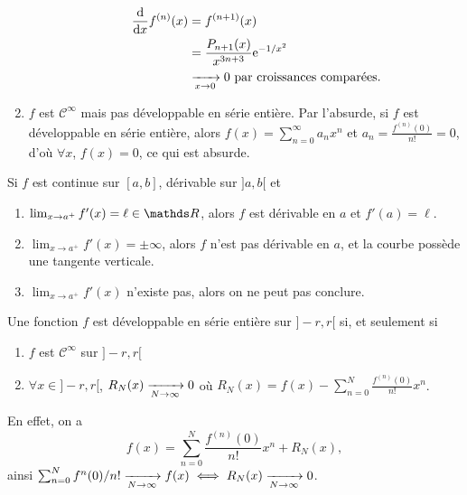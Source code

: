 \begin{exo}
\begin{enumerate}
\begin{itemize}
					\begin{align*}
						\frac{\mathrm{d}}{\mathrm{d}x} f^{(n)}(x) &= f^{(n+1)}(x) \\
						&= \frac{P_{n+1}(x)}{x^{3n+3}} \mathrm{e}^{ - 1/x^2} \\
						&\xrightarrow[x\to 0]{} 0 \text{ par croissances comparées}.
					\end{align*}
			\end{itemize}
		\item $f$\/ est $\mathcal{C}^\infty$\/ mais pas développable en série entière. Par l'absurde, si $f$\/ est développable en série entière, alors $f(x) = \sum_{n=0}^\infty a_n x^n$\/ et $a_n = \frac{f^{(n)}(0)}{n!} = 0$, d'où $\forall x$, $f(x) = 0$, ce qui est absurde.
	\end{enumerate}
\end{exo}

\begin{rap}
	Si $f$\/ est continue sur $[a,b]$, dérivable sur $]a,b[$ et
	\begin{enumerate}
		\item $\lim_{x\to a^+} f'(x) = \ell \in \R$, alors $f$\/ est dérivable en $a$\/ et $f'(a) = \ell$.
		\item $\lim_{x\to a^+} f'(x) = \pm \infty$, alors $f$\/ n'est pas dérivable en $a$, et la courbe possède une tangente verticale.
		\item $\lim_{x\to a^+} f'(x)$\/ n'existe pas, alors on ne peut pas conclure.
	\end{enumerate}
\end{rap}

\begin{prop}
	Une fonction $f$\/ est développable en série entière sur $]-r,r[$\/ si, et seulement si
	\begin{enumerate}
		\item $f$\/ est $\mathcal{C}^\infty$\/ sur $]-r,r[$\/
		\item $\forall x \in {]-r,r[}$, $R_N(x) \xrightarrow[N\to \infty]{} 0$\/ où $R_N(x) = f(x) - \sum_{n=0}^N \frac{f^{(n)}(0)}{n!} x^n$.
	\end{enumerate}
\end{prop}

\noindent
En effet, on a \[
	f(x) = \sum_{n=0}^N \frac{f^{(n)}(0)}{n!} x^n + R_N(x),
\] ainsi $\sum_{n=0}^N f^{n}(0) / n! \xrightarrow[N\to \infty]{} f(x) \iff R_N(x)\xrightarrow[N\to \infty]{} 0$.


